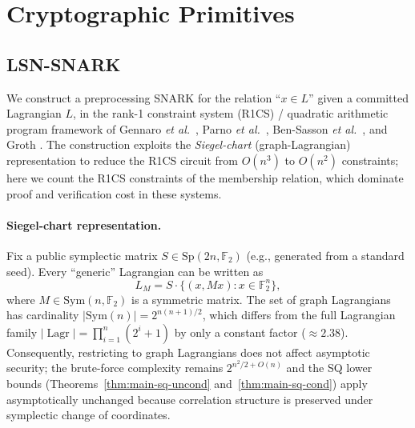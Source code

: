 \documentclass[11pt,a4paper]{article}
\theoremstyle{plain}
\theoremstyle{definition}
\newcommand{\F}{\mathbb{F}}
\DeclareMathOperator{\Lagr}{Lagr}
\newcommand{\etal}{\textit{et al.}}
\begin{document}
\section{Cryptographic Primitives}
\label{sec:primitives}

\subsection{LSN-SNARK}
\label{sec:snark}

We construct a preprocessing SNARK for the relation ``$x \in L$'' given a committed Lagrangian $L$, in the rank-1 constraint system (R1CS) / quadratic arithmetic program framework of Gennaro \etal\ \cite{GGPR13}, Parno \etal\ \cite{PHGR13}, Ben-Sasson \etal\ \cite{BCTV14}, and Groth \cite{Gro16}. The construction exploits the \emph{Siegel-chart} (graph-Lagrangian) representation to reduce the R1CS circuit from $O(n^3)$ to $O(n^2)$ constraints; here we count the R1CS constraints of the membership relation, which dominate proof and verification cost in these systems.

\paragraph{Siegel-chart representation.}
Fix a public symplectic matrix $S \in \mathrm{Sp}(2n,\F_2)$ (e.g., generated from a standard seed). Every ``generic'' Lagrangian can be written as
\[
L_M = S \cdot \{(x, Mx) : x \in \F_2^n\},
\]
where $M \in \mathrm{Sym}(n,\F_2)$ is a symmetric matrix. The set of graph Lagrangians has cardinality $|\mathrm{Sym}(n)| = 2^{n(n+1)/2}$, which differs from the full Lagrangian family $|\Lagr| = \prod_{i=1}^n (2^i+1)$ by only a constant factor ($\approx 2.38$). Consequently, restricting to graph Lagrangians does not affect asymptotic security; the brute-force complexity remains $2^{n^2/2+O(n)}$ and the SQ lower bounds (Theorems~\ref{thm:main-sq-uncond} and~\ref{thm:main-sq-cond}) apply asymptotically unchanged because correlation structure is preserved under symplectic change of coordinates.
\end{document}
